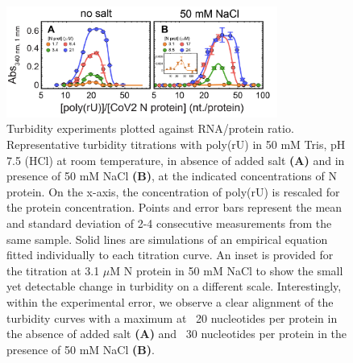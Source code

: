 \documentclass[../main.tex]{subfiles}
\begin{document}
        \begin{figure}[!htb] %
            \centering
            \includegraphics[width=3.5in]{appendix-e-fig12.png}
            \caption[Turbidity experiments plotted against RNA/protein ratio.]
                {Turbidity experiments plotted against RNA/protein ratio. Representative turbidity titrations with poly(rU) in 50 mM Tris, pH 7.5 (HCl) at room temperature, in absence of added salt \textbf{(A)} and in presence of 50 mM NaCl \textbf{(B)}, at the indicated concentrations of N protein. On the x-axis, the concentration of poly(rU) is rescaled for the protein concentration. Points and error bars represent the mean and standard deviation of 2-4 consecutive measurements from the same sample. Solid lines are simulations of an empirical equation fitted individually to each titration curve. An inset is provided for the titration at 3.1 $\mu$M N protein in 50 mM NaCl to show the small yet detectable change in turbidity on a different scale. Interestingly, within the experimental error, we observe a clear alignment of the turbidity curves with a maximum at ~20 nucleotides per protein in the absence of added salt \textbf{(A)} and ~30 nucleotides per protein in the presence of 50 mM NaCl \textbf{(B)}.}
            \label{fig:appendix-e-fig12}
        \end{figure}
\end{document}
